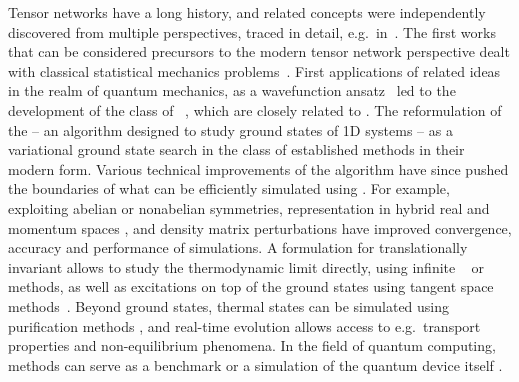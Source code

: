 Tensor networks have a long history, and related concepts were independently discovered from multiple perspectives, traced in detail, e.g.~in~\cite[Sec. I.B]{cirac2021}.
%
The first works that can be considered precursors to the modern tensor network perspective dealt with classical statistical mechanics problems~\cite{kramers1941, baxter1968}.
%
First applications of related ideas in the realm of quantum mechanics, as a wavefunction ansatz~\cite{accardi1981, affleck1987} led to the development of the class of ~\cite{fannes1989, fannes1992a, fannes1994}, which are closely related to .
%
The reformulation of the  \cite{white1992a, white1993a} -- an algorithm designed to study ground states of 1D systems -- as a variational ground state search in the class of  \cite{fannes1992a, ostlund1995, dukelsky1998, schollwock2011} established  methods in their modern form.
%
Various technical improvements of the algorithm have since pushed the boundaries of what can be efficiently simulated using .
%
For example, exploiting abelian \cite{singh2010b, singh2011a} or nonabelian \cite{mcculloch2002a, singh2012b, weichselbaum2012} symmetries, representation in hybrid real and momentum spaces \cite{motruk2016,ehlers2017}, and density matrix perturbations \cite{white2005b, hubig2015} have improved convergence, accuracy and performance of  simulations.
%
A formulation for translationally invariant  allows to study the thermodynamic limit directly, using infinite ~\cite{mcculloch2008} or ~\cite{zauner-stauber2018a} methods, as well as excitations on top of the ground states using tangent space methods~\cite{haegeman2013, vanderstraeten2015, vanderstraeten2019a}.
%
Beyond ground states, thermal states can be simulated using purification methods \cite{verstraete2004a, barthel2009}, and real-time evolution \cite{paeckel2019} allows access to e.g.~transport properties and non-equilibrium phenomena.
%
In the field of quantum computing,  methods can serve as a benchmark \cite{dang2019, tindall2024} or a simulation of the quantum device itself \cite{banuls2006, nguyen2022}.
%

